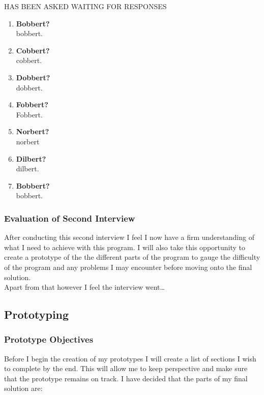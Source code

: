 \begin{FlushLeft}
            HAS BEEN ASKED WAITING FOR RESPONSES
            \begin{enumerate}
                \item {\bf{Bobbert?}} \\
                \bk
                bobbert.
                \item {\bf{Cobbert?}} \\
                \bk
                cobbert.
                \item {\bf{Dobbert?}} \\
                \bk
                dobbert.
                \item {\bf{Fobbert?}} \\
                \bk
                Fobbert.
                \item {\bf{Norbert?}} \\
                \bk
                norbert
                \item {\bf{Dilbert?}} \\
                \bk
                dilbert.
                \item {\bf{Bobbert?}} \\
                \bk
                bobbert.
            \end{enumerate}

            \subsubsection{Evaluation of Second Interview}
            After conducting this second interview I feel I now have a firm understanding of what I need to achieve with this program. I will also take this opportunity to create a prototype of the 
            the different parts of the program to gauge the difficulty of the program and any problems I may encounter before moving onto the final solution. \\ \bk
            Apart from that however I feel the interview went\dots %

        \subsection{Prototyping}
        \subsubsection{Prototype Objectives} 
        Before I begin the creation of my prototypes I will create a list of sections I wish to complete by the end. This will allow me to keep perspective and make sure that the prototype remains on track. I have decided that the parts of my final solution are:
        

\end{FlushLeft}
